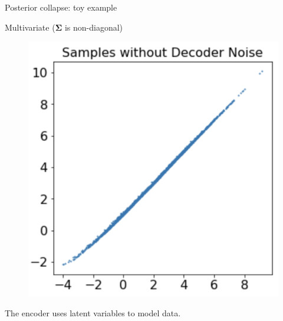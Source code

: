 \documentclass{beamer}
\newcommand{\bSigma}{\boldsymbol{\Sigma}}
\begin{document}
\begin{frame}{Posterior collapse: toy example}
\begin{block}{Multivariate ($\bSigma$ is non-diagonal)}
\begin{minipage}[t]{0.33\columnwidth}
\begin{figure}[h]
			\end{figure}
		\end{minipage}%
		\begin{minipage}[t]{0.33\columnwidth}
			\begin{figure}[h]
				\centering
				\includegraphics[width=.75\linewidth]{figs/posterior_collapse_toy_5.png}
			\end{figure}
		\end{minipage}
	The encoder uses latent variables to model data.
	\end{block}


\end{frame}
\end{document}
